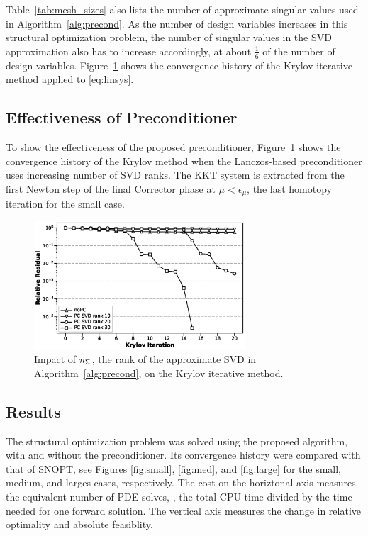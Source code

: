 Table~\ref{tab:mesh_sizes} also lists the number of approximate singular values
used in Algorithm~\ref{alg:precond}.  As the number of design variables
increases in this structural optimization problem, the number of singular values
in the SVD approximation also has to increase accordingly, at about $\frac{1}{6}$
of the number of design variables.
Figure~\ref{fig:svdrank} shows the convergence history of the Krylov iterative
method applied to \eqref{eq:linsys}.  

\subsection{Effectiveness of Preconditioner}
To show the effectiveness of the proposed preconditioner, 
Figure~\ref{fig:svdrank} shows the convergence history of the Krylov
method when the Lanczos-based preconditioner uses 
increasing number of SVD ranks. The KKT system is extracted from 
the first Newton step of the final Corrector phase 
at $\mu < \epsilon_{\mu}$, the last homotopy iteration for the small case. 

\begin{figure}[tbp]
  \centering
  \includegraphics[width=0.7\textwidth]{./figs/chap6_fstopo/tiny_svd_ranks.eps}
  \caption{Impact of $n_{\mathsf{\Sigma}}$, the rank of the approximate SVD in
    Algorithm~\ref{alg:precond}, on the Krylov iterative method.
  \label{fig:svdrank}}
\end{figure}

\subsection{Results}
The structural optimization problem was solved using the proposed algorithm,
with and without the preconditioner. Its convergence history were compared with 
that of SNOPT, see Figures \ref{fig:small}, \ref{fig:med}, and \ref{fig:large} for the 
small, medium, and larges cases, respectively. The cost on the horiztonal axis 
measures the equivalent number of PDE solves, 
\ie, the total CPU time divided by the time needed for one
forward solution.  The vertical axis measures the change in relative optimality and
absolute feasiblity.    
  
